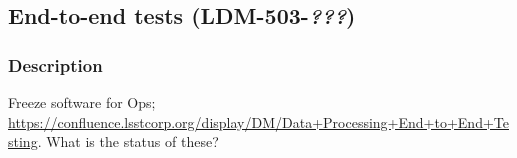 \subsection{End-to-end tests (\textbf{LDM-503-\textit{???}})}
\subsubsection{Description}
Freeze software for Ops; \url{https://confluence.lsstcorp.org/display/DM/Data+Processing+End+to+End+Testing}.
What is the status of these?








